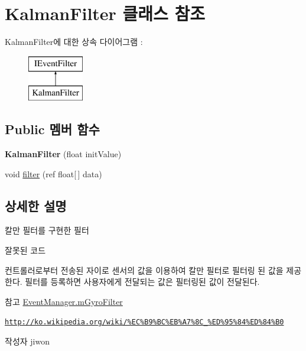 \hypertarget{class_kalman_filter}{}\section{Kalman\+Filter 클래스 참조}
\label{class_kalman_filter}
Kalman\+Filter에 대한 상속 다이어그램 \+: \begin{figure}[H]
\begin{center}
\leavevmode
\includegraphics[height=2.000000cm]{class_kalman_filter}
\end{center}
\end{figure}
\subsection*{Public 멤버 함수}
\begin{DoxyCompactItemize}
\item 
\hypertarget{class_kalman_filter_acd6545f9bd224b877adf564460f8bc73}{}{\bfseries Kalman\+Filter} (float init\+Value)\label{class_kalman_filter_acd6545f9bd224b877adf564460f8bc73}

\item 
void \hyperlink{class_kalman_filter_a9a7d63d4acea7ce12b83b00f9d02f7cb}{filter} (ref float\mbox{[}$\,$\mbox{]} data)
\end{DoxyCompactItemize}


\subsection{상세한 설명}
칼만 필터를 구현한 필터 \begin{DoxyRefDesc}{잘못된 코드}
\item[\hyperlink{deprecated__deprecated000001}{잘못된 코드}]\end{DoxyRefDesc}
컨트롤러로부터 전송된 자이로 센서의 값을 이용하여 칼만 필터로 필터링 된 값을 제공한다. 필터를 등록하면 사용자에게 전달되는 값은 필터링된 값이 전달된다. \begin{DoxySeeAlso}{참고}
\hyperlink{class_event_manager_a7cee85488f5d7220c102cd945b1f494a}{Event\+Manager.\+m\+Gyro\+Filter} 

\href{http://ko.wikipedia.org/wiki/%EC%B9%BC%EB%A7%8C_%ED%95%84%ED%84%B0}{\tt http\+://ko.\+wikipedia.\+org/wiki/\%\+E\+C\%\+B9\%\+B\+C\%\+E\+B\%\+A7\%8\+C\+\_\+\%\+E\+D\%95\%84\%\+E\+D\%84\%\+B0} 
\end{DoxySeeAlso}
\begin{DoxyAuthor}{작성자}
jiwon 
\end{DoxyAuthor}


